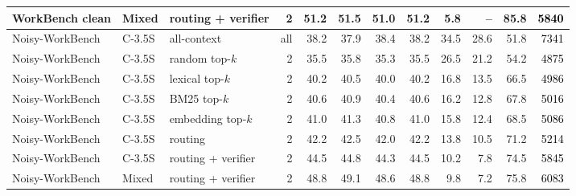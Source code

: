\begin{longtable}{lllrrrrrrrrr}
WorkBench clean & Mixed & \method{} routing + verifier & 2 & 51.2 & 51.5 & 51.0 & 51.2 & 5.8 & -- & 85.8 & \textcolor{black}{5840} \\
\midrule
Noisy-WorkBench & C-3.5S & all-context & all & 38.2 & 37.9 & 38.4 & 38.2 & 34.5 & 28.6 & 51.8 & \textcolor{black}{7341} \\
Noisy-WorkBench & C-3.5S & random top-$k$ & 2 & 35.5 & 35.8 & 35.3 & 35.5 & 26.5 & 21.2 & 54.2 & \textcolor{black}{4875} \\
Noisy-WorkBench & C-3.5S & lexical top-$k$ & 2 & 40.2 & 40.5 & 40.0 & 40.2 & 16.8 & 13.5 & 66.5 & \textcolor{black}{4986} \\
Noisy-WorkBench & C-3.5S & BM25 top-$k$ & 2 & 40.6 & 40.9 & 40.4 & 40.6 & 16.2 & 12.8 & 67.8 & \textcolor{black}{5016} \\
Noisy-WorkBench & C-3.5S & embedding top-$k$ & 2 & 41.0 & 41.3 & 40.8 & 41.0 & 15.8 & 12.4 & 68.5 & \textcolor{black}{5086} \\
Noisy-WorkBench & C-3.5S & \method{} routing & 2 & 42.2 & 42.5 & 42.0 & 42.2 & 13.8 & 10.5 & 71.2 & \textcolor{black}{5214} \\
\rowcolor{tracesoft}
Noisy-WorkBench & C-3.5S & \method{} routing + verifier & 2 & 44.5 & 44.8 & 44.3 & 44.5 & 10.2 & 7.8 & 74.5 & \textcolor{black}{5845} \\
Noisy-WorkBench & Mixed & \method{} routing + verifier & 2 & 48.8 & 49.1 & 48.6 & 48.8 & 9.8 & 7.2 & 75.8 & \textcolor{black}{6083} \\
\end{longtable}
\endgroup
